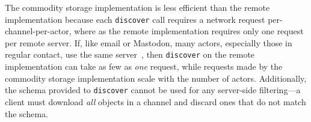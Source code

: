 


The commodity storage implementation is less efficient than the remote implementation because each
\texttt{discover} call requires a network request per-channel-per-actor,
where as the remote implementation requires only one request per remote server.
If, like email or Mastodon, many actors, especially those in regular contact,
use the same server~\cite{mastodonchallenges},
then \texttt{discover} on the remote implementation can take as
few as \emph{one} request, while requests made by
the commodity storage implementation scale with the number of actors.
Additionally, the schema provided to \texttt{discover} cannot be used for any
server-side filtering---a client must download \emph{all} objects in a channel
and discard ones that do not match the schema.

